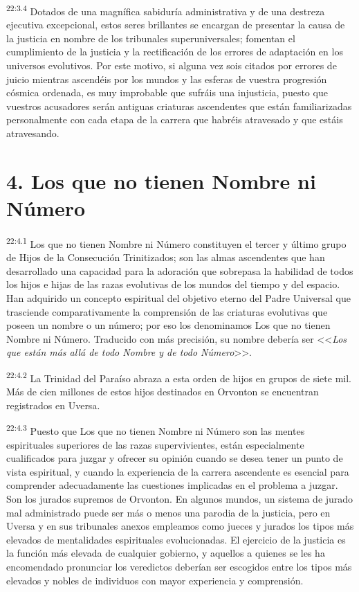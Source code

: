 \par
\textsuperscript{22:3.4} Dotados de una magnífica sabiduría administrativa y de una destreza ejecutiva excepcional, estos seres brillantes se encargan de presentar la causa de la justicia en nombre de los tribunales superuniversales; fomentan el cumplimiento de la justicia y la rectificación de los errores de adaptación en los universos evolutivos. Por este motivo, si alguna vez sois citados por errores de juicio mientras ascendéis por los mundos y las esferas de vuestra progresión cósmica ordenada, es muy improbable que sufráis una injusticia, puesto que vuestros acusadores serán antiguas criaturas ascendentes que están familiarizadas personalmente con cada etapa de la carrera que habréis atravesado y que estáis atravesando.

\section*{4. Los que no tienen Nombre ni Número}
\par
\textsuperscript{22:4.1} Los que no tienen Nombre ni Número constituyen el tercer y último grupo de Hijos de la Consecución Trinitizados; son las almas ascendentes que han desarrollado una capacidad para la adoración que sobrepasa la habilidad de todos los hijos e hijas de las razas evolutivas de los mundos del tiempo y del espacio. Han adquirido un concepto espiritual del objetivo eterno del Padre Universal que trasciende comparativamente la comprensión de las criaturas evolutivas que poseen un nombre o un número; por eso los denominamos Los que no tienen Nombre ni Número. Traducido con más precisión, su nombre debería ser <<\textit{Los que están \textit{más allá} de todo Nombre y de todo Número}>>.

\par
\textsuperscript{22:4.2} La Trinidad del Paraíso abraza a esta orden de hijos en grupos de siete mil. Más de cien millones de estos hijos destinados en Orvonton se encuentran registrados en Uversa.

\par
\textsuperscript{22:4.3} Puesto que Los que no tienen Nombre ni Número son las mentes espirituales superiores de las razas supervivientes, están especialmente cualificados para juzgar y ofrecer su opinión cuando se desea tener un punto de vista espiritual, y cuando la experiencia de la carrera ascendente es esencial para comprender adecuadamente las cuestiones implicadas en el problema a juzgar. Son los jurados supremos de Orvonton. En algunos mundos, un sistema de jurado mal administrado puede ser más o menos una parodia de la justicia, pero en Uversa y en sus tribunales anexos empleamos como jueces y jurados los tipos más elevados de mentalidades espirituales evolucionadas. El ejercicio de la justicia es la función más elevada de cualquier gobierno, y aquellos a quienes se les ha encomendado pronunciar los veredictos deberían ser escogidos entre los tipos más elevados y nobles de individuos con mayor experiencia y comprensión.

